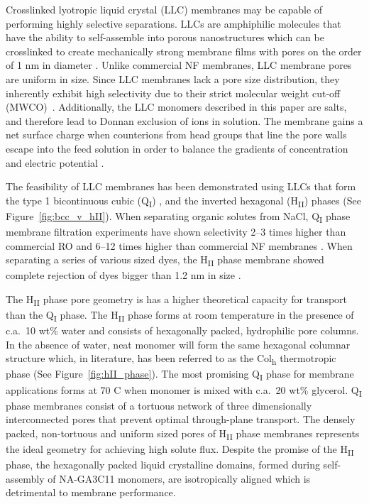 \documentclass[journal=jpcbfk,manusciprt=article]{achemso}
\begin{document}
  Crosslinked lyotropic liquid crystal (LLC) membranes may be capable of
  performing highly selective separations. LLCs are amphiphilic molecules that
  have the ability to self-assemble into porous nanostructures
  \cite{smith_ordered_1997} which can be crosslinked to create mechanically
  strong membrane films with pores on the order of 1 nm in diameter
  \cite{zhou_supported_2005}. Unlike commercial NF membranes, LLC membrane pores
  are uniform in size. Since LLC membranes lack a pore size distribution, they
  inherently exhibit high selectivity due to their strict molecular weight
  cut-off (MWCO)~\cite{zhou_supported_2005}. Additionally, the LLC monomers
  described in this paper
  are salts, and therefore lead to
  Donnan exclusion of ions in solution. The membrane gains a net surface charge
  when counterions from head groups that line the pore walls escape into the feed
  solution in order to balance the gradients of concentration and electric
  potential \cite{donnan_theory_1995}.    

  The feasibility of LLC membranes has been demonstrated using LLCs that form
  the type 1 bicontinuous cubic (Q\textsubscript{I})
  \cite{hatakeyama_water_2011,hatakeyama_nanoporous_2010,carter_glycerol-based_2012},
  and the inverted hexagonal (H\textsubscript{II}) \cite{zhou_supported_2005}
  phases (See Figure~\ref{fig:bcc_v_hII}). When separating organic solutes from
  NaCl, Q\textsubscript{I} phase membrane filtration experiments have shown
  selectivity 2--3 times higher than commercial RO and 6--12 times higher than
  commercial NF membranes \cite{dischinger_application_2017}.  When separating a
  series of various sized dyes, the H\textsubscript{II} phase membrane showed
  complete rejection of dyes bigger than 1.2 nm in size
  \cite{zhou_supported_2005}. 

  The H\textsubscript{II} phase pore geometry is 
has a higher theoretical capacity
for transport than the
  Q\textsubscript{I} phase. The H\textsubscript{II} phase forms at room
  temperature in the presence of c.a.~10 wt\% water and consists of hexagonally
  packed, hydrophilic pore columns\cite{smith_ordered_1997}. In the absence of
  water, neat monomer will form the same hexagonal columnar structure which, in
  literature, has been referred to as the Col\textsubscript{h} thermotropic
  phase\cite{feng_scalable_2014} (See Figure~\ref{fig:hII_phase}).  The most
  promising Q\textsubscript{I} phase for membrane applications forms at 70\degree
  C when monomer is mixed with c.a.~20 wt\%
  glycerol\cite{carter_glycerol-based_2012}. Q\textsubscript{I} phase membranes
  consist of a tortuous network of three dimensionally interconnected pores that
  prevent optimal through-plane transport. The densely packed, non-tortuous and
  uniform sized pores of H\textsubscript{II} phase membranes represents the ideal
  geometry for achieving high solute flux\cite{matyka_tortuosity-porosity_2008}.
  Despite the promise of the H\textsubscript{II} phase, the hexagonally packed
  liquid crystalline domains, formed during self-assembly of NA-GA3C11 monomers, are
  isotropically aligned which is detrimental to membrane performance. 
\end{document}
